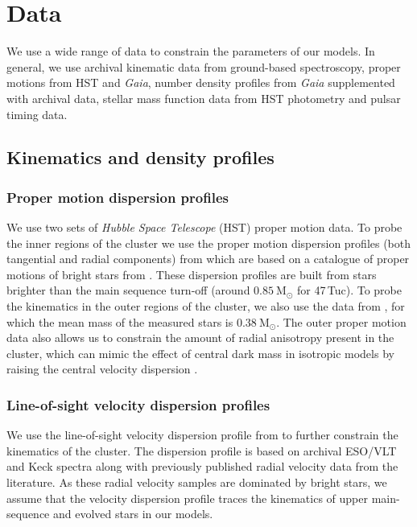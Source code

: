 \newcommand{\evolvemf}{\code{evolve\_mf}}



\section{Data}


We use a wide range of data to constrain the parameters of our models. In general, we use archival
kinematic data from ground-based spectroscopy, proper motions from HST and \emph{Gaia}, number
density profiles from \emph{Gaia} supplemented with archival data, stellar mass function data from
HST photometry and pulsar timing data.

\subsection{Kinematics and density profiles}

\subsubsection{Proper motion dispersion profiles}

We use two sets of {\it Hubble Space Telescope} (HST) proper motion data. To probe the inner regions
of the cluster we use the proper motion dispersion profiles (both tangential and radial components)
from \citet{Watkins2015} which are based on a catalogue of proper motions of bright stars from
\citet{Bellini2014}. These dispersion profiles are built from stars brighter than the main sequence
turn-off (around $0.85 \ \mathrm{M}_\odot$  for 47\,Tuc). To probe the kinematics in the outer
regions of the cluster, we also use the data from \citet{Heyl2017}, for which the mean mass of the
measured stars is $0.38 \ \mathrm{M}_{\odot}$. The outer proper motion data also allows us to
constrain the amount of radial anisotropy present in the cluster, which can mimic the effect of
central dark mass in isotropic models by raising the central velocity dispersion \citep{Zocchi2017}.


\subsubsection{Line-of-sight velocity dispersion profiles}
We use the line-of-sight velocity dispersion profile from \citet{Baumgardt2018} to further constrain
the kinematics of the cluster. The dispersion profile is based on archival ESO/VLT and Keck spectra
along with previously published radial velocity data from the literature. As these radial velocity
samples are dominated by bright stars, we assume that the velocity dispersion profile traces the
kinematics of upper main-sequence and evolved stars in our models.


